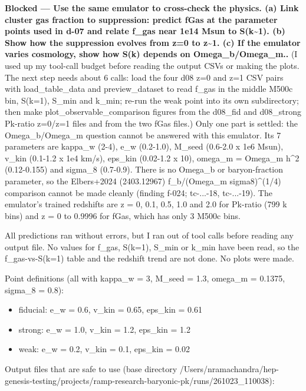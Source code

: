 \documentclass[11pt,a4paper]{article}
\begin{document}
\textbf{Blocked --- Use the same emulator to cross-check the physics. (a) Link cluster gas fraction to suppression: predict fGas at the parameter points used in d-07 and relate f\_gas near 1e14 Msun to S(k\textasciitilde{}1). (b) Show how the suppression evolves from z=0 to z\textasciitilde{}1. (c) If the emulator varies cosmology, show how S(k) depends on Omega\_b/Omega\_m..} (I used up my tool-call budget before reading the output CSVs or making the plots. The next step needs about 6 calls: load the four d08 z=0 and z=1 CSV pairs with load\_table\_data and preview\_dataset to read f\_gas in the middle M500c bin, S(k=1), S\_min and k\_min; re-run the weak point into its own subdirectory; then make plot\_observable\_comparison figures from the d08\_fid and d08\_strong Pk-ratio z=0/z=1 files and from the two fGas files.) Only one part is settled: the Omega\_b/Omega\_m question cannot be answered with this emulator. Its 7 parameters are kappa\_w (2-4), e\_w (0.2-1.0), M\_seed (0.6-2.0 x 1e6 Msun), v\_kin (0.1-1.2 x 1e4 km/s), eps\_kin (0.02-1.2 x 10), omega\_m = Omega\_m h\textasciicircum{}2 (0.12-0.155) and sigma\_8 (0.7-0.9). There is no Omega\_b or baryon-fraction parameter, so the Elbers+2024 (2403.12967) f\_b/(Omega\_m sigma8)\textasciicircum{}(1/4) comparison cannot be made cleanly (finding f-024; tc-...-18, tc-...-19). The emulator's trained redshifts are z = 0, 0.1, 0.5, 1.0 and 2.0 for Pk-ratio (799 k bins) and z = 0 to 0.9996 for fGas, which has only 3 M500c bins.

All predictions ran without errors, but I ran out of tool calls before reading any output file. No values for f\_gas, S(k=1), S\_min or k\_min have been read, so the f\_gas-vs-S(k=1) table and the redshift trend are not done. No plots were made.

Point definitions (all with kappa\_w = 3, M\_seed = 1.3, omega\_m = 0.1375, sigma\_8 = 0.8):

\begin{itemize}
  \item fiducial: e\_w = 0.6, v\_kin = 0.65, eps\_kin = 0.61
  \item strong: e\_w = 1.0, v\_kin = 1.2, eps\_kin = 1.2
  \item weak: e\_w = 0.2, v\_kin = 0.1, eps\_kin = 0.02
\end{itemize}
Output files that are safe to use (base directory /Users/nramachandra/hep-genesis-testing/projects/ramp-research-baryonic-pk/runs/261023\_110038):
\end{document}
